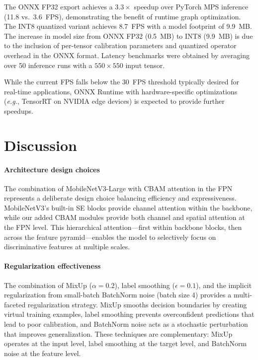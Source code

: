 \documentclass[conference]{IEEEtran}
\newcommand{\eg}{\emph{e.g.}}
\begin{document}
The ONNX FP32 export achieves a $3.3\times$ speedup over PyTorch MPS
inference (11.8 vs.\ 3.6~FPS), demonstrating the benefit of runtime
graph optimization. The INT8 quantized variant achieves 8.7~FPS with
a model footprint of 9.9~MB. The increase in model size from ONNX FP32
(0.5~MB) to INT8 (9.9~MB) is due to the inclusion of per-tensor
calibration parameters and quantized operator overhead in the ONNX
format. Latency benchmarks were obtained by averaging over 50 inference
runs with a $550 \times 550$ input tensor.

While the current FPS falls below the 30~FPS threshold typically desired
for real-time applications, ONNX Runtime with hardware-specific
optimizations (\eg, TensorRT on NVIDIA edge devices) is expected to
provide further speedups.

\section{Discussion}
\label{sec:discussion}

\paragraph{Architecture design choices}
The combination of MobileNetV3-Large with CBAM attention in the FPN
represents a deliberate design choice balancing efficiency and
expressiveness. MobileNetV3's built-in SE blocks provide channel
attention within the backbone, while our added CBAM modules provide
both channel and spatial attention at the FPN level. This hierarchical
attention---first within backbone blocks, then across the feature
pyramid---enables the model to selectively focus on discriminative
features at multiple scales.

\paragraph{Regularization effectiveness}
The combination of MixUp ($\alpha = 0.2$), label smoothing
($\epsilon = 0.1$), and the implicit regularization from small-batch
BatchNorm noise (batch size 4) provides a multi-faceted regularization
strategy. MixUp smooths decision boundaries by creating virtual training
examples, label smoothing prevents overconfident predictions that lead
to poor calibration, and BatchNorm noise acts as a stochastic
perturbation that improves generalization. These techniques are
complementary: MixUp operates at the input level, label smoothing at
the target level, and BatchNorm noise at the feature level.
\end{document}

